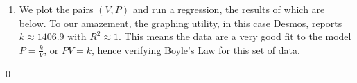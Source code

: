 \documentclass{ximera}
\begin{document}
\begin{example}
\begin{enumerate}
\item  We plot the pairs $(V, P)$ and run a regression, the results of which are below.  To our amazement, the graphing utility, in this case Desmos, reports $k \approx 1406.9$ with  $R^2 \approx 1$.  This means the data are a very good fit to the model $P = \frac{k}{V}$, or $PV = k$, hence verifying Boyle's Law for this set of data.

\begin{center} 
\end{center}

\end{enumerate}
\qed

\end{example}



\closegraphsfile
\end{document}
